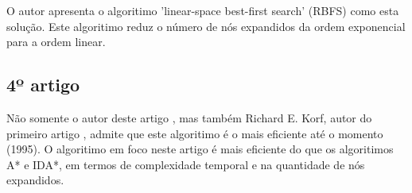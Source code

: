 \documentclass[a4paper]{article}
\begin{document}
O autor apresenta o algoritimo 'linear-space best-first search' (RBFS) como esta solução. Este algoritimo reduz o número de nós expandidos da ordem exponencial para a ordem linear.

\subsection{4º artigo}

Não somente o autor deste artigo \cite{Dillenburg1994}, mas também Richard E. Korf, autor do primeiro artigo \cite{Korf1995}, admite que este algoritimo é o mais eficiente até o momento (1995). O algoritimo em foco neste artigo é mais eficiente do que os algoritimos A* e IDA*, em termos de complexidade temporal e na quantidade de nós expandidos.




\end{document}
